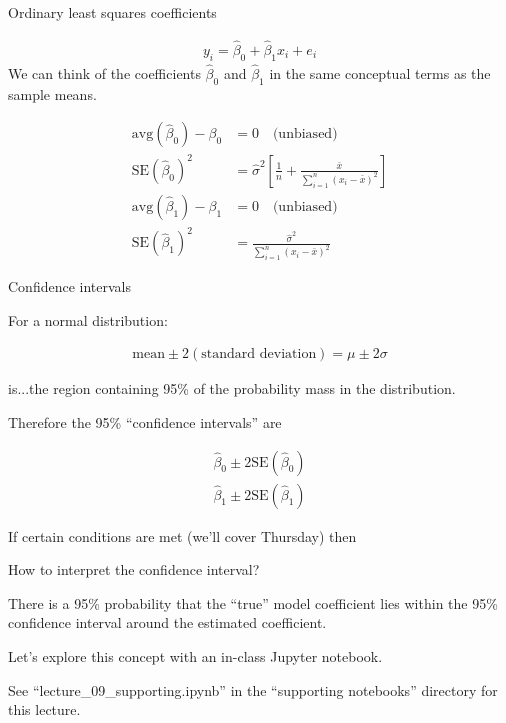 \documentclass[aspectratio=169]{beamer}
\begin{document}
\begin{frame}{Ordinary least squares coefficients}

\begin{align*}
y_i=\hat{\beta}_0+\hat{\beta}_1x_i+e_i
\end{align*}
We can think of the coefficients $\hat{\beta}_0$ and $\hat{\beta}_1$ in the same conceptual terms as the sample means.

\begin{align*}
\text{avg}(\hat{\beta}_0) - \beta_0 &= 0\quad\text{(unbiased)}\\
\text{SE}(\hat{\beta}_0)^2 &= \hat{\sigma}^2 \left[ \frac{1}{n} +
\frac{\bar{x}}{\sum_{i=1}^n (x_i-\bar{x})^2} \right]\\
\text{avg}(\hat{\beta}_{1}) - \beta_1 &= 0\quad\text{(unbiased)}\\
\text{SE}(\hat{\beta}_1)^2& = \frac{\hat{\sigma}^2}{\sum_{i=1}^n (x_i-\bar{x})^2}
\end{align*}

\end{frame}

\begin{frame}{Confidence intervals}

For a normal distribution:

\begin{align*}
\text{mean} \pm 2 (\text{standard deviation}) = \mu \pm 2\sigma
\end{align*}

is...\pause the region containing 95\% of the probability mass in the distribution.  

\vspace{5mm}

Therefore the 95\% ``confidence intervals'' are

\begin{align*}
\hat{\beta}_0 \pm 2\text{SE}(\hat{\beta}_0) \\
\hat{\beta}_1 \pm 2\text{SE}(\hat{\beta}_1) 
\end{align*}

If certain conditions are met (we'll cover Thursday) then 
\end{frame}

\begin{frame}{How to interpret the confidence interval?}

\pause

There is a 95\% probability that the ``true'' model coefficient lies within the 95\% confidence interval around the estimated coefficient.  

\vspace{5mm}

Let's explore this concept with an in-class Jupyter notebook.

\vspace{5mm}

  See ``lecture\_09\_supporting.ipynb'' in the ``supporting notebooks'' directory for this lecture.


\end{frame}
\end{document}
